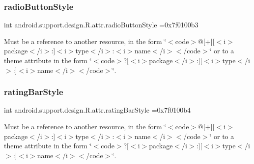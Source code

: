 \subsubsection{\texorpdfstring{radio\+Button\+Style}{radioButtonStyle}}
{\footnotesize\ttfamily int android.\+support.\+design.\+R.\+attr.\+radio\+Button\+Style =0x7f0100b3\hspace{0.3cm}{\ttfamily [static]}}

Must be a reference to another resource, in the form \char`\"{}$<$code$>$@\mbox{[}+\mbox{]}\mbox{[}$<$i$>$package$<$/i$>$\+:\mbox{]}$<$i$>$type$<$/i$>$\+:$<$i$>$name$<$/i$>$$<$/code$>$\char`\"{} or to a theme attribute in the form \char`\"{}$<$code$>$?\mbox{[}$<$i$>$package$<$/i$>$\+:\mbox{]}\mbox{[}$<$i$>$type$<$/i$>$\+:\mbox{]}$<$i$>$name$<$/i$>$$<$/code$>$\char`\"{}. \mbox{\label{classandroid_1_1support_1_1design_1_1R_1_1attr_a0c99b738ca23e4fd5b38f04d0b494a99}} 
\subsubsection{\texorpdfstring{rating\+Bar\+Style}{ratingBarStyle}}
{\footnotesize\ttfamily int android.\+support.\+design.\+R.\+attr.\+rating\+Bar\+Style =0x7f0100b4\hspace{0.3cm}{\ttfamily [static]}}

Must be a reference to another resource, in the form \char`\"{}$<$code$>$@\mbox{[}+\mbox{]}\mbox{[}$<$i$>$package$<$/i$>$\+:\mbox{]}$<$i$>$type$<$/i$>$\+:$<$i$>$name$<$/i$>$$<$/code$>$\char`\"{} or to a theme attribute in the form \char`\"{}$<$code$>$?\mbox{[}$<$i$>$package$<$/i$>$\+:\mbox{]}\mbox{[}$<$i$>$type$<$/i$>$\+:\mbox{]}$<$i$>$name$<$/i$>$$<$/code$>$\char`\"{}. \mbox{\label{classandroid_1_1support_1_1design_1_1R_1_1attr_a3aa9f493418e2936285f232cc189efa5}} 
